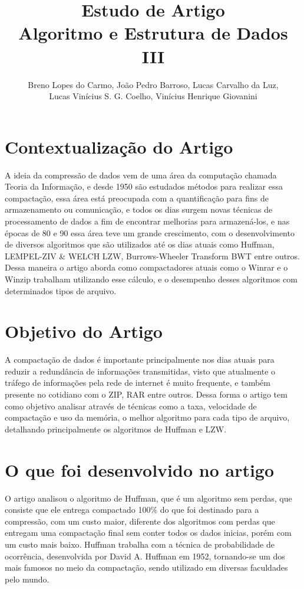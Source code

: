 \documentclass[12pt]{article}
\title{Estudo de Artigo\\ Algoritmo e Estrutura de Dados III}
\author{Breno Lopes do Carmo, João Pedro Barroso, Lucas Carvalho da Luz,\\Lucas Vinícius S. G. Coelho, Vinícius Henrique Giovanini}
\begin{document}
 

\maketitle
 

\section {Contextualização do Artigo}

A ideia da compressão de dados vem de uma área da computação chamada Teoria da Informação, e desde 1950 são estudados métodos para realizar essa compactação, essa área está preocupada com a quantificação para fins de armazenamento ou comunicação, e todos os dias surgem novas técnicas de processamento de dados a fim de encontrar melhorias para armazená-los, e nas épocas de 80 e 90 essa área teve um grande crescimento, com o desenvolvimento de diversos algoritmos que são utilizados até os dias atuais como Huffman, LEMPEL-ZIV & WELCH LZW, Burrows-Wheeler Transform BWT entre outros. Dessa maneira o artigo aborda como compactadores atuais como o Winrar e o Winzip trabalham utilizando esse cálculo, e o desempenho desses algoritmos com determinados tipos de arquivo.

\section {Objetivo do Artigo}

A compactação de dados é importante principalmente nos dias atuais para reduzir a redundância de informações transmitidas, visto que atualmente o tráfego de informações pela rede de internet é muito frequente, e também presente no cotidiano com o ZIP, RAR entre outros. Dessa forma o artigo tem como objetivo analisar através de técnicas como a taxa, velocidade de compactação e uso da memória, o melhor algoritmo para cada tipo de arquivo, detalhando principalmente os algoritmos de Huffman e LZW.

\section {O que foi desenvolvido no artigo}

O artigo analisou o algoritmo de Huffman, que é um algoritmo sem perdas, que consiste que ele entrega compactado 100\% do que foi destinado para a compressão, com um custo maior, diferente dos algoritmos com perdas que entregam uma compactação final sem conter todos os dados inicias, porém com um custo mais baixo. Huffman trabalha com a técnica de probabilidade de ocorrência, desenvolvida por David A. Huffman em 1952, tornando-se um dos mais famosos no meio da compactação, sendo utilizado em diversas faculdades pelo mundo.
\end{document}
